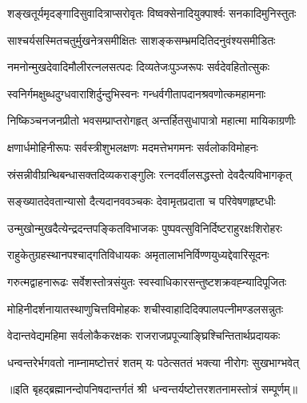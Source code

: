 \twolineshloka
{शङ्खतूर्यमृदङ्गादिसुवादित्राप्सरोवृतः}
{विष्वक्सेनादियुक्पार्श्वः सनकादिमुनिस्तुतः}

\twolineshloka
{साश्चर्यसस्मितचतुर्मुखनेत्रसमीक्षितः}
{साशङ्कसम्भ्रमदितिदनुवंश्यसमीडितः}

\twolineshloka
{नमनोन्मुखदेवादिमौलीरत्नलसत्पदः}
{दिव्यतेजःपुञ्जरूपः सर्वदेवहितोत्सुकः}

\twolineshloka
{स्वनिर्गमक्षुब्धदुग्धवाराशिर्दुन्दुभिस्वनः}
{गन्धर्वगीतापदानश्रवणोत्कमहामनाः}

\twolineshloka
{निष्किञ्चनजनप्रीतो भवसम्प्राप्तरोगहृत्}
{अन्तर्हितसुधापात्रो महात्मा मायिकाग्रणीः}

\twolineshloka
{क्षणार्धमोहिनीरूपः सर्वस्त्रीशुभलक्षणः}
{मदमत्तेभगमनः सर्वलोकविमोहनः}

\twolineshloka
{स्रंसन्नीवीग्रन्थिबन्धासक्तदिव्यकराङ्गुलिः}
{रत्नदर्वीलसद्धस्तो देवदैत्यविभागकृत्}

\twolineshloka
{सङ्ख्यातदेवतान्यासो दैत्यदानववञ्चकः}
{देवामृतप्रदाता च परिवेषणहृष्टधीः}

\twolineshloka
{उन्मुखोन्मुखदैत्येन्द्रदन्तपङ्कितविभाजकः}
{पुष्पवत्सुविनिर्दिष्टराहुरक्षःशिरोहरः}

\twolineshloka
{राहुकेतुग्रहस्थानपश्चाद्गतिविधायकः}
{अमृतालाभनिर्विण्णयुध्यद्देवारिसूदनः}

\twolineshloka
{गरुत्मद्वाहनारूढः सर्वेशस्तोत्रसंयुतः}
{स्वस्वाधिकारसन्तुष्टशक्रवह्न्यादिपूजितः}

\twolineshloka
{मोहिनीदर्शनायातस्थाणुचित्तविमोहकः}
{शचीस्वाहादिदिक्पालपत्नीमण्डलसन्नुतः}

\twolineshloka
{वेदान्तवेद्यमहिमा सर्वलोकैकरक्षकः}
{राजराजप्रपूज्याङ्घ्रिश्चिन्तितार्थप्रदायकः}

\twolineshloka
{धन्वन्तरेर्भगवतो नाम्नामष्टोत्तरं शतम्}
{यः पठेत्सततं भक्त्या नीरोगः सुखभाग्भवेत्}

{॥इति बृहद्ब्रह्मानन्दोपनिषदान्तर्गतं
    श्री~धन्वन्तर्यष्टोत्तरशतनामस्तोत्रं सम्पूर्णम्॥}